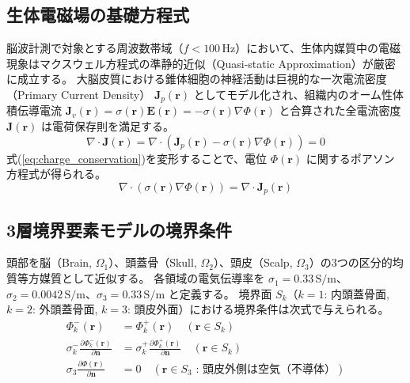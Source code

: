\documentclass[platex,dvipdfmx,12pt]{jsarticle}
\begin{document}
\subsection{生体電磁場の基礎方程式}
脳波計測で対象とする周波数帯域（$f < 100\,\text{Hz}$）において、生体内媒質中の電磁現象はマクスウェル方程式の準静的近似（Quasi-static Approximation）が厳密に成立する。
大脳皮質における錐体細胞の神経活動は巨視的な一次電流密度（Primary Current Density） $\mathbf{J}_p(\mathbf{r})$ としてモデル化され、組織内のオーム性体積伝導電流 $\mathbf{J}_v(\mathbf{r}) = \sigma(\mathbf{r}) \mathbf{E}(\mathbf{r}) = -\sigma(\mathbf{r}) \nabla \Phi(\mathbf{r})$ と合算された全電流密度 $\mathbf{J}(\mathbf{r})$ は電荷保存則を満足する。
\begin{equation}
  \nabla \cdot \mathbf{J}(\mathbf{r}) = \nabla \cdot \left( \mathbf{J}_p(\mathbf{r}) - \sigma(\mathbf{r}) \nabla \Phi(\mathbf{r}) \right) = 0
  \label{eq:charge_conservation}
\end{equation}
式(\ref{eq:charge_conservation})を変形することで、電位 $\Phi(\mathbf{r})$ に関するポアソン方程式が得られる。
\begin{equation}
  \nabla \cdot (\sigma(\mathbf{r}) \nabla \Phi(\mathbf{r})) = \nabla \cdot \mathbf{J}_p(\mathbf{r})
  \label{eq:poisson}
\end{equation}

\subsection{3層境界要素モデルの境界条件}
頭部を脳（Brain, $\Omega_1$）、頭蓋骨（Skull, $\Omega_2$）、頭皮（Scalp, $\Omega_3$）の3つの区分的均質等方媒質として近似する。
各領域の電気伝導率を $\sigma_1 = 0.33\,\text{S/m}$、$\sigma_2 = 0.0042\,\text{S/m}$、$\sigma_3 = 0.33\,\text{S/m}$ と定義する。
境界面 $S_k$（$k=1$: 内頭蓋骨面, $k=2$: 外頭蓋骨面, $k=3$: 頭皮外面）における境界条件は次式で与えられる。
\begin{align}
  \Phi_k^-(\mathbf{r}) &= \Phi_k^+(\mathbf{r}) \quad (\mathbf{r} \in S_k) \label{eq:bc_potential}\\
  \sigma_k^- \frac{\partial \Phi_k^-(\mathbf{r})}{\partial \mathbf{n}} &= \sigma_k^+ \frac{\partial \Phi_k^+(\mathbf{r})}{\partial \mathbf{n}} \quad (\mathbf{r} \in S_k) \label{eq:bc_current}\\
  \sigma_3 \frac{\partial \Phi(\mathbf{r})}{\partial \mathbf{n}} &= 0 \quad (\mathbf{r} \in S_3 \text{ : 頭皮外側は空気（不導体）}) \label{eq:bc_outer}
\end{align}
\end{document}
